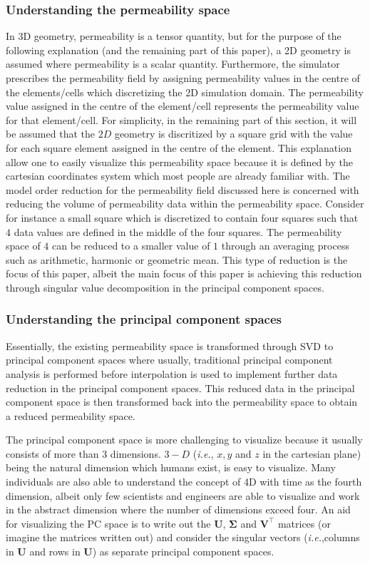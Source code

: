 \documentclass[preprint,12pt]{elsarticle}
\begin{document}
\subsubsection{Understanding the permeability space}\label{subsubsection:visualization_permspace}
In 3D geometry, permeability is a tensor quantity, but for the purpose of the following explanation (and the remaining part of this paper), a 2D geometry is assumed where permeability is a scalar quantity. Furthermore, the simulator prescribes the permeability field by assigning permeability values in the centre of the elements/cells which discretizing the 2D simulation domain. The permeability value assigned in the centre of the element/cell represents the permeability value for that element/cell. For simplicity, in the remaining part of this section, it will be assumed that the $2D$ geometry is discritized by a square grid with the value for each square element assigned in the centre of the element. This explanation allow one to easily visualize this permeability space because it is defined by the cartesian coordinates  system which most people are already familiar with. The model order reduction for the permeability field discussed here is concerned with reducing the volume of permeability data within the permeability space. Consider for instance a small square which is discretized to contain four squares such that $4$ data values are defined in the middle of the four squares. The permeability space of $4$ can be reduced to a smaller value of $1$ through an averaging process such as arithmetic, harmonic or geometric mean. This type of reduction is the focus of this paper, albeit the main focus of this paper is achieving this reduction through singular value decomposition in the principal component spaces. 

\subsubsection{Understanding the principal component spaces}\label{subsubsection:visualization_pcspaces}
Essentially, the existing permeability space is transformed through SVD to principal component spaces where usually, traditional principal component analysis is performed before interpolation is used to implement further data reduction in the principal component spaces. This reduced data in the principal component space is then transformed back into the permeability space to obtain a reduced permeability space.

The principal component space is more challenging to visualize because it usually consists of more than $3$ dimensions. $3-D$ ({\it i.e.}, $x, y$ and $z$ in the cartesian plane) being the natural dimension which humans exist, is easy to visualize. Many individuals are also able to understand the concept of 4D with time as the fourth dimension, albeit only few scientists and engineers are able to visualize and work in the abstract dimension where the number of dimensions exceed four. An aid for visualizing the PC space is to write out the $\mathbf{U}$, $\mathbf{\Sigma}$ and $\mathbf{V^{\intercal}}$ matrices (or imagine the matrices written out) and consider the singular vectors ({\it i.e.},columns in $\mathbf{U}$ and rows in $\mathbf{U}$) as separate principal component spaces.
\end{document}
